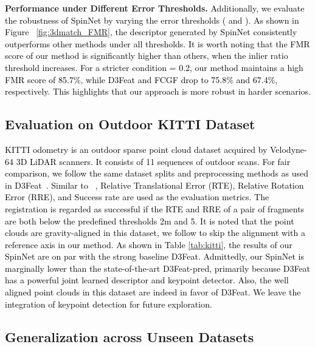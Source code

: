 \documentclass[final]{cvpr}
\newcommand{\qy}[1]{\textcolor{black}{#1}}
\newcommand{\nickname}{SpinNet}
\begin{document}
\smallskip\noindent\textbf{Performance under Different Error Thresholds.} \qy{ Additionally, we evaluate the robustness of \nickname{} by varying the error thresholds ( and ). As shown in Figure ~\ref{fig:3dmatch_FMR}, the descriptor generated by \nickname{} consistently outperforms other methods under all thresholds. It is worth noting that the FMR score of our method is significantly higher than others, when the inlier ratio threshold increases. For a stricter condition  = 0.2, our method maintains a high FMR score of 85.7\%, while D3Feat and FCGF drop to 75.8\% and 67.4\%, respectively. This highlights that our approach is more robust in harder scenarios.} 






 
\subsection{Evaluation on Outdoor KITTI Dataset}
\label{Ex:kitti}


\qy{KITTI odometry \cite{geiger2012we} is an outdoor sparse point cloud dataset acquired by Velodyne-64 3D LiDAR scanners. It consists of 11 sequences of outdoor scans. For fair comparison, we follow the same dataset splits and preprocessing methods as used in D3Feat~\cite{bai2020d3feat, choy2019fully}. Similar to ~\cite{ma2016fast}, Relative Translational Error (RTE), Relative Rotation Error (RRE), and Success rate are used as the evaluation metrics. The registration is regarded as successful if the RTE and RRE of a pair of fragments are both below the predefined thresholds 2m and 5. It is noted that the point clouds are gravity-aligned in this dataset, we follow \cite{Yew2018} to skip the alignment with a reference axis in our method. As shown in Table \ref{tab:kitti}, the results of our \nickname{} are on par with the strong baseline D3Feat. Admittedly, our \nickname{} is marginally lower than the state-of-the-art D3Feat-pred, primarily because D3Feat has a powerful joint learned descriptor and keypoint detector. Also, the well aligned point clouds in this dataset are indeed in favor of D3Feat. We leave the integration of keypoint detection for future exploration.}






 
\subsection{Generalization across Unseen Datasets}
\label{Ex:generalization}
\end{document}
